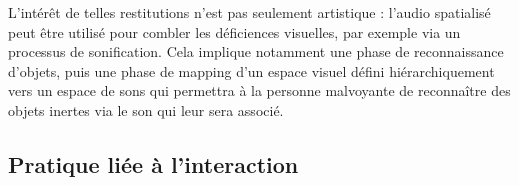 \documentclass[french,12pt]{article}
\begin{document}
L'intérêt de telles restitutions n'est pas seulement artistique : l'audio spatialisé peut être utilisé pour combler les déficiences visuelles, par exemple via un processus de sonification\cite{tang_assistive_2014}. Cela implique notamment une phase de reconnaissance d'objets, puis une phase de mapping d'un espace visuel défini hiérarchiquement vers un espace de sons qui permettra à la personne malvoyante de reconnaître des objets inertes via le son qui leur sera associé.

\subsection{Pratique liée à l'interaction}

\end{document}
